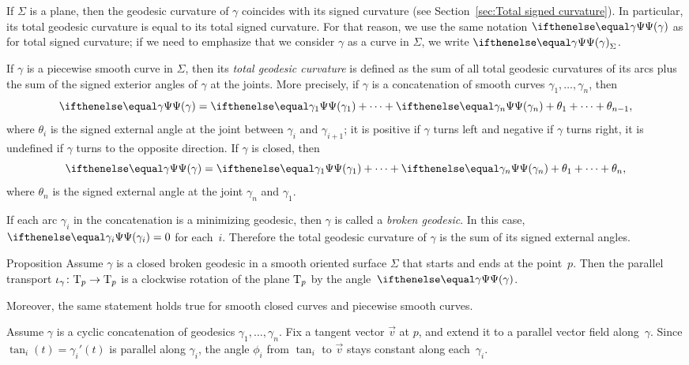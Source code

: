 If $\Sigma$ is a plane, then the geodesic curvature of $\gamma$ coincides
with its signed curvature (see Section~\ref{sec:Total signed curvature}). 
In particular, its total geodesic curvature is equal to its total signed curvature.
For that reason, we use the same notation $\tgc\gamma$ as for total signed curvature; if we need to emphasize that we consider $\gamma$ as a curve in $\Sigma$, we write $\tgc\gamma_\Sigma$.

If $\gamma$ is a piecewise smooth curve in $\Sigma$, then
its \emph{total geodesic curvature} is defined as the sum of all total geodesic curvatures of its arcs plus the sum of the signed exterior angles of $\gamma$ at the joints.
More precisely, if $\gamma$ is a concatenation of smooth curves $\gamma_1,\dots,\gamma_n$, then
\[\tgc\gamma=\tgc{\gamma_1}+\dots+\tgc{\gamma_n}+\theta_1+\dots+\theta_{n-1},\]
where $\theta_i$ is the signed external angle at the joint between $\gamma_i$ and $\gamma_{i+1}$;
it is positive if $\gamma$ turns left and negative if $\gamma$ turns right, it is undefined if $\gamma$ turns to the opposite direction.
If $\gamma$ is closed, then 
\[\tgc\gamma=\tgc{\gamma_1}+\dots+\tgc{\gamma_n}+\theta_1+\dots+\theta_n,\]
where $\theta_n$ is the signed external angle at the joint $\gamma_n$ and $\gamma_1$.

If each arc $\gamma_i$ in the concatenation is a minimizing geodesic, then $\gamma$ is called a \emph{broken geodesic}.
In this case, $\tgc{\gamma_i}=0$ for each~$i$.
Therefore the total geodesic curvature of $\gamma$ is the sum of its signed external angles.

\begin{thm}{Proposition}\label{prop:pt+tgc}
Assume $\gamma$ is a closed broken geodesic in a smooth oriented surface $\Sigma$ that starts and ends at the point~$p$.
Then the parallel transport $\iota_\gamma\colon\mathrm{T}_p\to\mathrm{T}_p$ is a clockwise rotation of the plane $\mathrm{T}_p$ by the angle~$\tgc\gamma$.

Moreover, the same statement holds true for smooth closed curves and piecewise smooth curves.
\end{thm}

Assume $\gamma$ is a cyclic concatenation of geodesics $\gamma_1,\dots,\gamma_n$.
Fix a tangent vector ${\vec v}$ at $p$, and extend it to a parallel vector field along~$\gamma$.
Since $\tan_i(t)=\gamma_i'(t)$ is parallel along $\gamma_i$, the angle $\phi_i$ from $\tan_i$ to ${\vec v}$ stays constant along each~$\gamma_i$.

